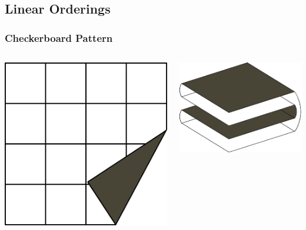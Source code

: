 \documentclass{beamer}
\begin{document}

\subsection{Linear Orderings}

\begin{frame}
\frametitle{Checkerboard Pattern}

\bigskip

\begin{columns}[c]
\includegraphics[width=\textwidth]{sam_images/checkerboard-1.pdf}

\pause

\includegraphics[width=\textwidth]{sam_images/checkerboard-2.pdf}

\end{columns}

\end{frame}
\end{document}
